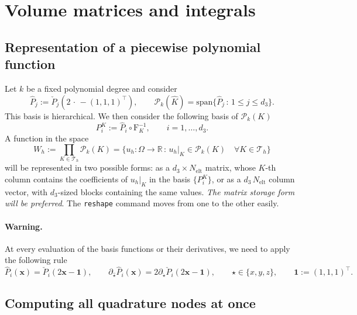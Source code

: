\documentclass[10pt,english]{article}
\newcommand{\Nelt}{{N_{\mathrm{elt}}}}
\begin{document}
\section{Volume matrices and integrals}

\subsection{Representation of a piecewise polynomial function}

Let $k$ be a fixed polynomial degree and consider
\[
\widehat P_j:=\check P_j(2\,\cdot\,-(1,1,1)^\top) , \qquad \mathcal P_k(\widehat K)=\mathrm{span}\{ \widehat P_j\,:\, 1\le j\le d_3\}.
\]
This basis is hierarchical.
We then consider the following basis of $\mathcal P_k(K)$
\[
P_i^K :=\widehat P_i\circ \mathrm F_K^{-1} , \qquad i=1,\ldots,d_3.
\]
A function in the space
\[
W_h:=\prod_{K\in \mathcal T_h}\mathcal P_k(K)=\{ u_h :\Omega\to\mathbb R\,:\, u_h|_K \in \mathcal P_k(K)\quad\forall K\in \mathcal T_h\} 
\]
will be represented in two possible forms: as a $d_3\times \Nelt$ matrix, whose $K$-th column contains the coefficients of $u_h|_K$ in the basis $\{ P_i^K\}$, or as a $d_3\,\Nelt$ column vector, with $d_3$-sized blocks containing the same values. {\em The matrix storage form will be preferred}. The {\tt reshape} command moves from one to the other easily.

\paragraph{Warning.} At every evaluation of the basis functions or their derivatives, we need to apply the following rule
\[
\widehat P_i(\mathbf x)=\check P_i(2\mathbf x-\mathbf 1), \qquad \partial_{\widehat \star} \widehat P_i(\mathbf x)=2\partial_{\check\star}\check P_i(2\mathbf x-\mathbf 1), \qquad \star\in \{x,  y,  z\}, \qquad \mathbf 1:=(1,1,1)^\top.
\]

\subsection{Computing all quadrature nodes at once}\label{sec:3.3}
\end{document}
